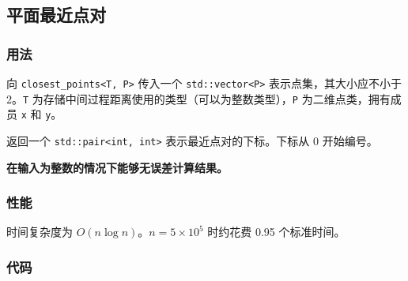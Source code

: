 \subsection{平面最近点对}

\subsubsection{用法}

向 \lstinline{closest_points<T, P>} 传入一个 \lstinline{std::vector<P>} 表示点集，其大小应不小于 2。\lstinline{T} 为存储中间过程距离使用的类型（可以为整数类型），\lstinline{P} 为二维点类，拥有成员 \lstinline{x} 和 \lstinline{y}。

返回一个 \lstinline{std::pair<int, int>} 表示最近点对的下标。下标从 0 开始编号。

\textbf{在输入为整数的情况下能够无误差计算结果。}

\subsubsection{性能}

时间复杂度为 $O(n \log n)$。$n = 5 \times 10^5$ 时约花费 0.95 个标准时间。

\subsubsection{代码}


